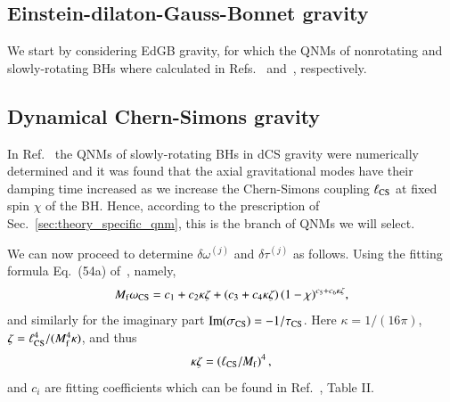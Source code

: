 \documentclass[twocolumn,
               prd,
               aps,
               superscriptaddress,
               tightenlines,
               nofootinbib,
               eqsecnum,
               amsfonts,
               amsmath,
               longbibliography]{revtex4-1}
\begin{document}
\subsection{Einstein-dilaton-Gauss-Bonnet gravity}
\label{app:map_edgb}

We start by considering EdGB gravity, for which the QNMs of nonrotating and
slowly-rotating BHs where calculated in
Refs.~\cite{Pani:2009wy,Blazquez-Salcedo:2016enn} and~\cite{Pierini:2021jxd},
respectively.

\subsection{Dynamical Chern-Simons gravity}
\label{app:map_dcs}

%
In Ref.~\cite{Wagle:2021tam} the QNMs of slowly-rotating BHs in dCS gravity were numerically determined
and it was found that the axial gravitational modes have their damping time increased as we
increase the Chern-Simons coupling $\ell_{\rm CS}$ at fixed spin $\chi$ of the BH.
%
Hence, according to the prescription of Sec.~\ref{sec:theory_specific_qnm}, this is the branch of QNMs we will select.

We can now proceed to determine $\delta\omega^{(j)}$ and $\delta\tau^{(j)}$ as follows.
%
Using the fitting formula Eq.~(54a) of~\cite{Wagle:2021tam}, namely,
%
\begin{equation}
    M_{\rm f} \omega_{\rm CS} = c_{1} + c_{2} \kappa \zeta + (c_{3} + c_{4} \kappa \zeta) \, (1 - \chi)^{c_{5} + c_{6} \kappa \zeta},
    \label{eq:omega_dsc_eg}
\end{equation}
%
and similarly for the imaginary part ${\rm Im}(\sigma_{\rm CS}) =  - 1 / \tau_{\rm CS}$.
%
Here $\kappa = 1/(16 \pi)$, $\zeta = \ell_{\rm CS}^{4} / (M_{\rm f}^4 \kappa)$, and thus
%
\begin{equation}
    \kappa \zeta = (\ell_{\rm CS} / M_{\rm f})^4 \,,
\end{equation}
%
and $c_{i}$ are fitting coefficients which can be found in Ref.~\cite{Wagle:2021tam}, Table II.
\end{document}
